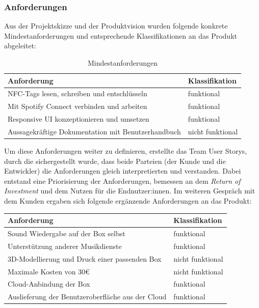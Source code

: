 \documentclass[10pt, a4paper]{article}
\begin{document}
\begin{onehalfspace}
\subsubsection{Anforderungen}
Aus der Projektskizze und der Produktvision wurden folgende konkrete Mindestanforderungen und entsprechende Klassifikationen an das Produkt abgeleitet:
\begin{center}
  \begin{table}[h!]
    \begin{tabular}{l|l}
      Anforderung & Klassifikation\\
      \hline
      NFC-Tags lesen, schreiben und entschlüsseln & funktional  \\
      Mit Spotify Connect verbinden und arbeiten & funktional \\
      Responsive UI konzeptionieren und umsetzen & funktional  \\
      Aussagekräftige Dokumentation mit Benutzerhandbuch & nicht funktional  \\
    \end{tabular}
    \caption{\label{mind-anforderungen}Mindestanforderungen}
\end{table}
\end{center}
Um diese Anforderungen weiter zu definieren, erstellte das Team User Storys,
durch die sichergestellt wurde, dass beide Parteien (der Kunde und die Entwickler) die Anforderungen  gleich interpretierten und verstanden.
Dabei entstand eine Priorisierung der Anforderungen, bemessen an dem \textit{Return of Investment} und dem Nutzen für die Endnutzer:innen.
Im weiteren Gespräch mit dem Kunden ergaben sich folgende ergänzende Anforderungen an das Produkt:
\begin{center}
  \begin{table}[h!]
    \begin{tabular}{l|l}
    Anforderung & Klassifikation \\
    \hline
    Sound Wiedergabe auf der Box selbst & funktional  \\
    Unterstützung anderer Musikdienste & funktional \\
    3D-Modellierung und Druck einer passenden Box & nicht funktional  \\
    Maximale Kosten von 30€ & nicht funktional  \\
    Cloud-Anbindung der Box & funktional \\
    Auslieferung der Benutzeroberfläche aus der Cloud & funktional \\
    \end{tabular}

\end{table}
\end{center}
\end{onehalfspace}
\end{document}
